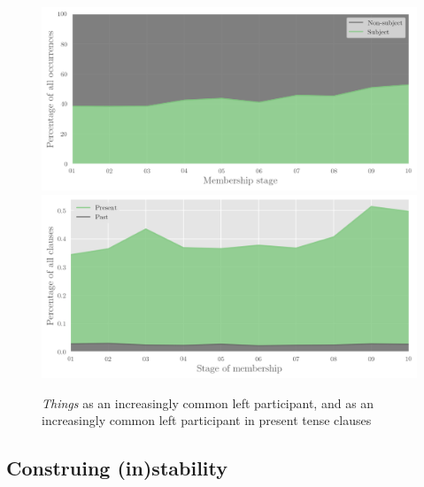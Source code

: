 
\begin{figure}[htb]
    \centering
    \includegraphics[width=1.00\textwidth]{../images/things-area.png}
    \endminipage\hfill
    \centering
    \includegraphics[width=1.00\textwidth]{../images/tense-things-new-area.png}
    \endminipage\hfill
    \caption[Increasing use of \emph{things}]{\emph{Things} as an increasingly common left participant, and as an increasingly common left participant in present tense clauses}
    \label{fig:thingstense}
    \end{figure}

\FloatBarrier
\subsection{Construing (in)stability}

